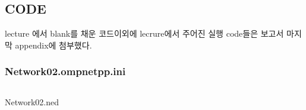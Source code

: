 \subsection*{CODE}
\vspace{-3mm}
lecture 에서 blank를 채운 코드이외에 lecrure에서 주어진 실행 code들은 보고서 마지막 appendix에 첨부했다.
\vspace{-3mm}
    \subsubsection*{Network02.ompnetpp.ini}
        \vspace{-2mm}
        \begin{listing}[h!]
        \inputminted[framerule = 1pt,framesep = 2mm , frame = lines, fontsize=\scriptsize]{c}{./code/week12/Experiment_02/ini.cpp}
        \vspace{-3mm}
        \caption{\footnotesize Network02.ned}
        \vspace{-3mm}
        \end{listing}
        \vspace{-6mm}
\clearpage
